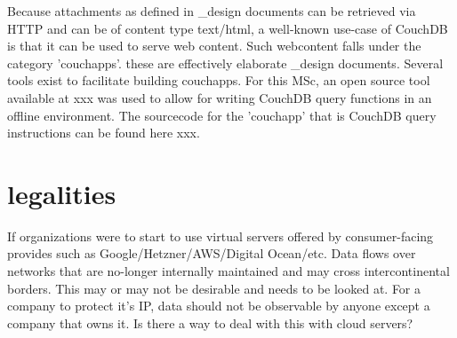Because attachments as defined in _design documents can be retrieved via HTTP and can be of content type text/html, a well-known use-case of CouchDB is that it can be used to serve web content. Such webcontent falls under the category 'couchapps'. these are effectively elaborate _design documents. Several tools exist to facilitate building couchapps. For this MSc, an open source tool available at xxx was used to allow for writing CouchDB query functions in an offline environment. The sourcecode for the 'couchapp' that is CouchDB query instructions can be found here xxx.

\section{legalities}
If organizations were to start to use virtual servers offered by consumer-facing provides such as Google/Hetzner/AWS/Digital Ocean/etc. Data flows over networks that are no-longer internally maintained and may cross intercontinental borders. This may or may not be desirable and needs to be looked at. For a company to protect it's IP, data should not be observable by anyone except a company that owns it. Is there a way to deal with this with cloud servers?